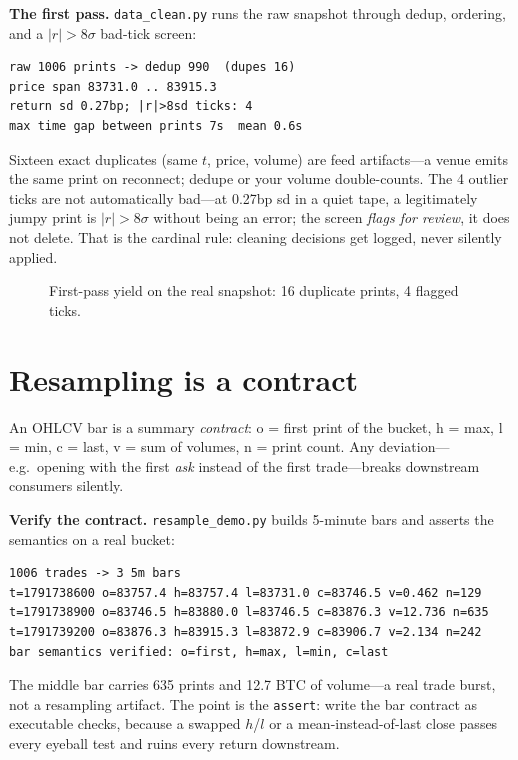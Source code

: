 \begin{example}\label{ex:clean}
\textbf{The first pass.} \texttt{data\_clean.py} runs the raw snapshot through dedup,
ordering, and a $|r|>8\sigma$ bad-tick screen:
\begin{lstlisting}[numbers=none]
raw 1006 prints -> dedup 990  (dupes 16)
price span 83731.0 .. 83915.3
return sd 0.27bp; |r|>8sd ticks: 4
max time gap between prints 7s  mean 0.6s
\end{lstlisting}
\begin{solution}
Sixteen exact duplicates (same $t$, price, volume) are feed artifacts---a venue emits the
same print on reconnect; dedupe or your volume double-counts. The 4 outlier ticks are not
automatically bad---at 0.27bp sd in a quiet tape, a legitimately jumpy print is $|r|>8\sigma$
without being an error; the screen \emph{flags for review}, it does not delete. That is the
cardinal rule: cleaning decisions get logged, never silently applied.
\end{solution}
\end{example}

\begin{figure}[htbp]\centering

\caption{First-pass yield on the real snapshot: 16 duplicate prints, 4 flagged ticks.}
\label{fig:dedup}
\end{figure}

\section{Resampling is a contract}\label{sec:resample}

An OHLCV bar is a summary \emph{contract}: o = first print of the bucket, h = max, l = min,
c = last, v = sum of volumes, n = print count. Any deviation---e.g.\ opening with the first
\emph{ask} instead of the first trade---breaks downstream consumers silently.

\begin{example}\label{ex:resample}
\textbf{Verify the contract.} \texttt{resample\_demo.py} builds 5-minute bars and asserts the
semantics on a real bucket:
\begin{lstlisting}[numbers=none]
1006 trades -> 3 5m bars
t=1791738600 o=83757.4 h=83757.4 l=83731.0 c=83746.5 v=0.462 n=129
t=1791738900 o=83746.5 h=83880.0 l=83746.5 c=83876.3 v=12.736 n=635
t=1791739200 o=83876.3 h=83915.3 l=83872.9 c=83906.7 v=2.134 n=242
bar semantics verified: o=first, h=max, l=min, c=last
\end{lstlisting}
\begin{solution}
The middle bar carries 635 prints and 12.7 BTC of volume---a real trade burst, not a
resampling artifact. The point is the \texttt{assert}: write the bar contract as executable
checks, because a swapped $h$/$l$ or a mean-instead-of-last close passes every eyeball test
and ruins every return downstream.
\end{solution}
\end{example}

